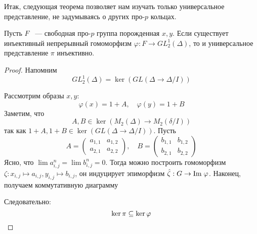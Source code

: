     Итак, следующая теорема позволяет нам изучать только универсальное представление, не задумываясь о других про-$p$ кольцах.

    \vskip 0.1in\noindent
    \begin{theorem}[Зубков, 1987]
        Пусть $F$ ~--- свободная про-$p$ группа порожденная $x, y$.
        Если существует инъективный непрерывный гомоморфизм $\varphi: F \to GL^1_2(\Delta)$, то и универсальное представление $\pi$ инъективно.
    \end{theorem}
    \begin{proof}
        Напомним
        \[
            GL^1_2(\Delta) = \ker{(GL(\Delta \to \Delta / I))}
        \]

        Рассмотрим образы $x, y$:
        \[
            \varphi(x) = 1 + A, \quad
            \varphi(y) = 1 + B
        \]
        Заметим, что
        \[
            A, B \in \ker{(M_2(\Delta)\to M_2(\delta/I))}
        \]
        так как $1 + A, 1 + B \in \ker{(GL(\Delta \to \Delta / I))}$.
        Пусть
        \[
            A=
            \begin{pmatrix}
                a_{1,1} & a_{1,2} \\
                a_{2,1} & a_{2,2}
            \end{pmatrix},
            \quad
            B=
            \begin{pmatrix}
                b_{1,1} & b_{1,2} \\
                b_{2,1} & b_{2,2}
            \end{pmatrix}
        \]
        Ясно, что $\lim a_{i,j}^n = \lim b_{i,j}^n = 0$.
        Тогда можно построить гомоморфизм $\zeta: x_{i,j} \mapsto a_{i,j}, y_{i,j} \mapsto b_{i,j}$, он индуцирует эпиморфизм
        $\hat{\zeta}: G \to \mathrm{Im}\hspace{0.1cm}{\varphi}$.
        Наконец, получаем коммутативную диаграмму
        \begin{center}
        \end{center}
        Следовательно:
        \[
            \ker{\pi} \subseteq \ker{\varphi} \qedhere
        \]

    \end{proof}

